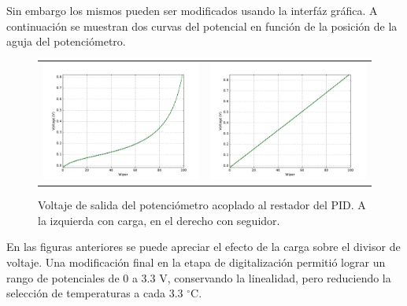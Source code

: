 \documentclass{wileysix}
\begin{document}
Sin embargo los mismos pueden ser modificados usando la interf\'az gr\'afica. A continuaci\'on se muestran dos curvas del potencial en funci\'on de la posici\'on de la aguja del potenci\'ometro.
\begin{figure}[h]
	\begin{tabular}{cc}
		\includegraphics[width=0.5\linewidth]{extras/without_follower.pdf}
		& 
		\includegraphics[width=0.5\linewidth]{extras/with_follower.pdf}
	\end{tabular}
	\caption{Voltaje de salida del potenci\'ometro acoplado al restador del PID. A la izquierda con carga, en el derecho con seguidor.}
\end{figure}

En las figuras anteriores se puede apreciar el efecto de la carga sobre el divisor de voltaje. Una modificaci\'on final en la etapa de digitalizaci\'on permiti\'o lograr un rango de potenciales de 0 a 3.3 V, conservando la linealidad, pero reduciendo la selecci\'on de temperaturas a cada 3.3 $^\circ$C.
\end{document}
